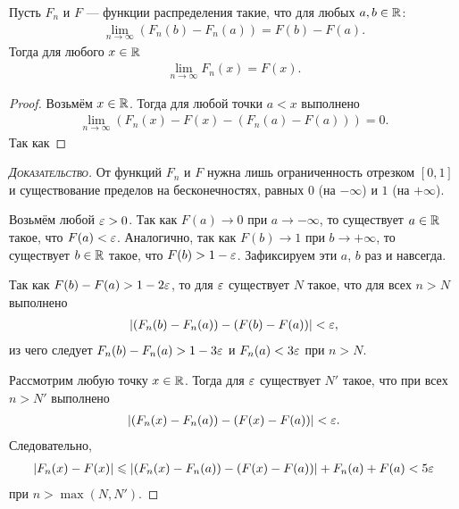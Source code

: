 \documentclass[../main.tex]{subfiles}
\begin{document}
\begin{remrk}
 \label{remrk:lim_f_n_using_f_n_a_minnus_f_n_b}
 Пусть $ F_n $ и $ F $ --- функции распределения такие, что для любых $ a, b \in \mathbb{R} $:
 \begin{align*}
  \lim_{n \to \infty} (F_n(b) - F_n(a)) = F(b)  - F(a).
 \end{align*} Тогда для любого $ x \in \mathbb{R} $
 \begin{align*}
  \lim_{n \to \infty} F_n(x) = F(x).
 \end{align*}
\end{remrk}
\begin{proof}
 Возьмём $ x \in\mathbb{R} $. Тогда для любой точки $ a < x $ выполнено
 \begin{align*}
  \lim_{n \to \infty} (F_n(x) - F(x) - (F_n(a)-F(a))) = 0.
 \end{align*} Так как 
\end{proof}
\begin{proof}[\normalfont\textsc{Доказательство}]
 От функций $ F_n $ и $ F $ нужна лишь ограниченность отрезком $ [0,1] $ и существование пределов на бесконечностях, равных $ 0 $ (на $ -\infty $) и $ 1 $ (на $ +\infty $).

 Возьмём любой $ \varepsilon > 0 $. Так как $ F(a) \to 0 $ при $ a \to -\infty $, то существует $ a \in \mathbb{R} $ такое, что $ F(a) < \varepsilon $. Аналогично, так как $ F(b) \to 1 $ при $ b \to +\infty $, то существует $ b \in \mathbb{R} $ такое, что $ F(b) > 1 - \varepsilon $. Зафиксируем эти $ a $, $ b $ раз и навсегда.

 Так как $ F(b) - F(a) > 1 - 2\varepsilon $, то для $ \varepsilon $ существует $ N $ такое, что для всех $ n > N $ выполнено
 \begin{align*}
  \left|(F_n(b) - F_n(a)) - (F(b)-F(a)) \right| < \varepsilon,
 \end{align*} из чего следует $ F_n(b) - F_n(a) > 1 - 3\varepsilon $ и $ F_n(a) < 3\varepsilon $ при $ n > N $.

 Рассмотрим любую точку $ x \in \mathbb{R} $. Тогда для $ \varepsilon $ существует $ N' $ такое, что при всех $ n > N' $ выполнено
 \begin{align*}
  \left|(F_n(x) - F_n(a)) - (F(x)-F(a)) \right| < \varepsilon.
 \end{align*} Следовательно,
 \begin{align*}
  \left|F_n(x) - F(x) \right| \leqslant \left| (F_n(x) - F_n(a)) - (F(x) - F(a)) \right| + F_n(a) + F(a) < 5\varepsilon
 \end{align*} при $ n > \max(N,N') $.
\end{proof}
\end{document}

